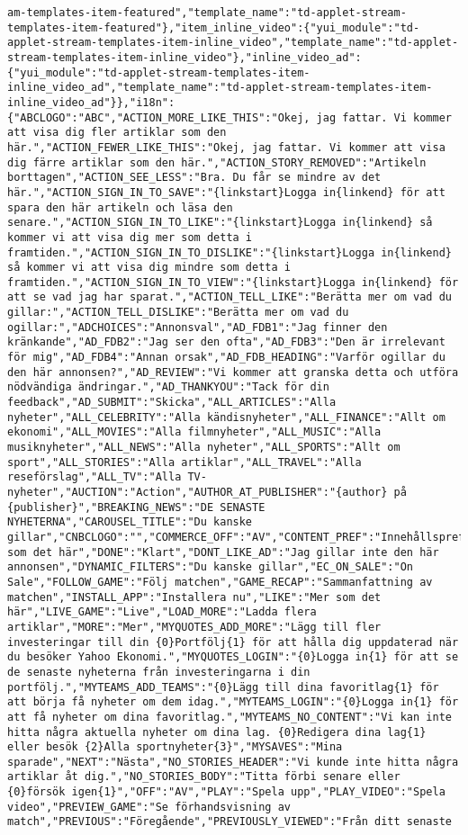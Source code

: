 \begin{verbatim}
am-templates-item-featured","template_name":"td-applet-stream-templates-item-featured"},"item_inline_video":{"yui_module":"td-applet-stream-templates-item-inline_video","template_name":"td-applet-stream-templates-item-inline_video"},"inline_video_ad":{"yui_module":"td-applet-stream-templates-item-inline_video_ad","template_name":"td-applet-stream-templates-item-inline_video_ad"}},"i18n":{"ABCLOGO":"ABC","ACTION_MORE_LIKE_THIS":"Okej, jag fattar. Vi kommer att visa dig fler artiklar som den här.","ACTION_FEWER_LIKE_THIS":"Okej, jag fattar. Vi kommer att visa dig färre artiklar som den här.","ACTION_STORY_REMOVED":"Artikeln borttagen","ACTION_SEE_LESS":"Bra. Du får se mindre av det här.","ACTION_SIGN_IN_TO_SAVE":"{linkstart}Logga in{linkend} för att spara den här artikeln och läsa den senare.","ACTION_SIGN_IN_TO_LIKE":"{linkstart}Logga in{linkend} så kommer vi att visa dig mer som detta i framtiden.","ACTION_SIGN_IN_TO_DISLIKE":"{linkstart}Logga in{linkend} så kommer vi att visa dig mindre som detta i framtiden.","ACTION_SIGN_IN_TO_VIEW":"{linkstart}Logga in{linkend} för att se vad jag har sparat.","ACTION_TELL_LIKE":"Berätta mer om vad du gillar:","ACTION_TELL_DISLIKE":"Berätta mer om vad du ogillar:","ADCHOICES":"Annonsval","AD_FDB1":"Jag finner den kränkande","AD_FDB2":"Jag ser den ofta","AD_FDB3":"Den är irrelevant för mig","AD_FDB4":"Annan orsak","AD_FDB_HEADING":"Varför ogillar du den här annonsen?","AD_REVIEW":"Vi kommer att granska detta och utföra nödvändiga ändringar.","AD_THANKYOU":"Tack för din feedback","AD_SUBMIT":"Skicka","ALL_ARTICLES":"Alla nyheter","ALL_CELEBRITY":"Alla kändisnyheter","ALL_FINANCE":"Allt om ekonomi","ALL_MOVIES":"Alla filmnyheter","ALL_MUSIC":"Alla musiknyheter","ALL_NEWS":"Alla nyheter","ALL_SPORTS":"Allt om sport","ALL_STORIES":"Alla artiklar","ALL_TRAVEL":"Alla reseförslag","ALL_TV":"Alla TV-nyheter","AUCTION":"Action","AUTHOR_AT_PUBLISHER":"{author} på {publisher}","BREAKING_NEWS":"DE SENASTE NYHETERNA","CAROUSEL_TITLE":"Du kanske gillar","CNBCLOGO":"","COMMERCE_OFF":"AV","CONTENT_PREF":"Innehållspreferenser","DISLIKE":"Mindre som det här","DONE":"Klart","DONT_LIKE_AD":"Jag gillar inte den här annonsen","DYNAMIC_FILTERS":"Du kanske gillar","EC_ON_SALE":"On Sale","FOLLOW_GAME":"Följ matchen","GAME_RECAP":"Sammanfattning av matchen","INSTALL_APP":"Installera nu","LIKE":"Mer som det här","LIVE_GAME":"Live","LOAD_MORE":"Ladda flera artiklar","MORE":"Mer","MYQUOTES_ADD_MORE":"Lägg till fler investeringar till din {0}Portfölj{1} för att hålla dig uppdaterad när du besöker Yahoo Ekonomi.","MYQUOTES_LOGIN":"{0}Logga in{1} för att se de senaste nyheterna från investeringarna i din portfölj.","MYTEAMS_ADD_TEAMS":"{0}Lägg till dina favoritlag{1} för att börja få nyheter om dem idag.","MYTEAMS_LOGIN":"{0}Logga in{1} för att få nyheter om dina favoritlag.","MYTEAMS_NO_CONTENT":"Vi kan inte hitta några aktuella nyheter om dina lag. {0}Redigera dina lag{1} eller besök {2}Alla sportnyheter{3}","MYSAVES":"Mina sparade","NEXT":"Nästa","NO_STORIES_HEADER":"Vi kunde inte hitta några artiklar åt dig.","NO_STORIES_BODY":"Titta förbi senare eller {0}försök igen{1}","OFF":"AV","PLAY":"Spela upp","PLAY_VIDEO":"Spela video","PREVIEW_GAME":"Se förhandsvisning av match","PREVIOUS":"Föregående","PREVIOUSLY_VIEWED":"Från ditt senaste 
\end{verbatim}
